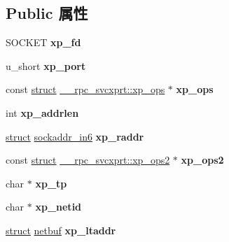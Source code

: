 \subsection*{Public 属性}
\begin{DoxyCompactItemize}
\item 
\mbox{\label{struct____rpc__svcxprt_a7a2c716e09cbeb9627949156f52a8234}} 
S\+O\+C\+K\+ET {\bfseries xp\+\_\+fd}
\item 
\mbox{\label{struct____rpc__svcxprt_a23515f04dd0667e823379e86274ced3f}} 
u\+\_\+short {\bfseries xp\+\_\+port}
\item 
\mbox{\label{struct____rpc__svcxprt_af8edb6d79b14d4f58beae44188ce5e67}} 
const \hyperlink{interfacestruct}{struct} \hyperlink{struct____rpc__svcxprt_1_1xp__ops}{\+\_\+\+\_\+rpc\+\_\+svcxprt\+::xp\+\_\+ops} $\ast$ {\bfseries xp\+\_\+ops}
\item 
\mbox{\label{struct____rpc__svcxprt_aca5b68cc7cbbeb83d3ceb2a88485445a}} 
int {\bfseries xp\+\_\+addrlen}
\item 
\mbox{\label{struct____rpc__svcxprt_a4a26819fd7f08e805f7d509ce3d929c3}} 
\hyperlink{interfacestruct}{struct} \hyperlink{structsockaddr__in6}{sockaddr\+\_\+in6} {\bfseries xp\+\_\+raddr}
\item 
\mbox{\label{struct____rpc__svcxprt_aa397805f98e8fefd3118d14456a8042e}} 
const \hyperlink{interfacestruct}{struct} \hyperlink{struct____rpc__svcxprt_1_1xp__ops2}{\+\_\+\+\_\+rpc\+\_\+svcxprt\+::xp\+\_\+ops2} $\ast$ {\bfseries xp\+\_\+ops2}
\item 
\mbox{\label{struct____rpc__svcxprt_a44d811c036f1593845a04ab667a29e12}} 
char $\ast$ {\bfseries xp\+\_\+tp}
\item 
\mbox{\label{struct____rpc__svcxprt_a16df75528a6b9998cb69e52557fe2ed1}} 
char $\ast$ {\bfseries xp\+\_\+netid}
\item 
\mbox{\label{struct____rpc__svcxprt_adde3970e5ffac5d4b0a3cf44c9dec993}} 
\hyperlink{interfacestruct}{struct} \hyperlink{structnetbuf}{netbuf} {\bfseries xp\+\_\+ltaddr}

\end{DoxyCompactItemize}
